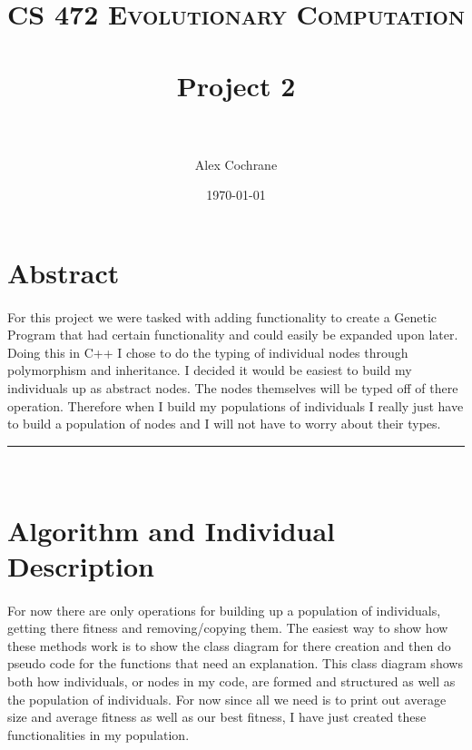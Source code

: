 \documentclass[paper=a4, fontsize=11pt]{scrartcl} %
\title{	
\normalfont \normalsize 
\textsc{CS 472 Evolutionary Computation} \\ [25pt] %
\horrule{0.5pt} \\[0.4cm] %
\huge Project 2 \\ %
\horrule{2pt} \\[0.5cm] %
}
\author{Alex Cochrane} %
\date{\normalsize\today} %
\numberwithin{equation}{section} %
\numberwithin{figure}{section} %
\numberwithin{table}{section} %
\newcommand{\horrule}[1]{\rule{\linewidth}{#1}} %
\begin{document}
\maketitle %


\section{Abstract}


\paragraph{} For this project we were tasked with adding functionality to create a Genetic Program that had certain functionality and could easily be expanded upon later. Doing this in C++ I chose to do the typing of individual nodes through polymorphism and inheritance. I decided it would be easiest to build my individuals up as abstract nodes. The nodes themselves will be typed off of there operation. Therefore when I build my populations of individuals I really just have to build a population of nodes and I will not have to worry about their types.


\horrule{0.5pt} \\[0.4cm] %
\section{Algorithm and Individual Description}

\paragraph{} For now there are only operations for building up a population of individuals, getting there fitness and removing/copying them. The easiest way to show how these methods work is to show the class diagram for there creation and then do pseudo code for the functions that need an explanation. This class diagram shows both how individuals, or nodes in my code, are formed and structured as well as the population of individuals. For now since all we need is to print out average size and average fitness as well as our best fitness, I have just created these functionalities in my population.
\end{document}
